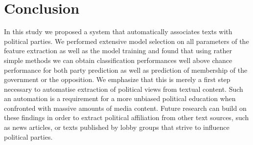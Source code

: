 \documentclass{article} %
\begin{document}
\section{Conclusion}
In this study we proposed a system that automatically associates texts with political parties. We performed extensive model selection on all parameters of the feature extraction as well as the model training and found that using rather simple methods we can obtain classification performances well above chance performance for both party prediction as well as prediction of membership of the government or the opposition. We emphasize that this is merely a first step necessary to automatise extraction of political views from textual content. Such an automation is a requirement for a more unbiased political education when confronted with massive amounts of media content. Future research can build on these findings in order to extract political affiliation from other text sources, such as news articles, or texts published by lobby groups that strive to influence political parties. 

\small{

 
}
\end{document}
